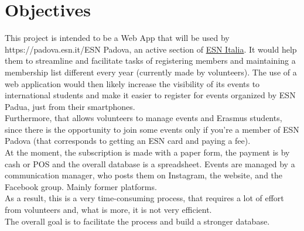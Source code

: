 \section{Objectives}

This project is intended to be a Web App that will be used by
{https://padova.esn.it/}ESN Padova, an active section of \href{https://padova.esn.it/}{ESN Italia}.
It would help them to streamline and facilitate tasks of
registering members and maintaining a membership list different every year (currently made by volunteers).
The use of a web application would then likely increase the visibility of its events to international students
and make it easier to register for events organized by ESN Padua, just from their smartphones.\\
Furthermore, that allows volunteers to
manage events and Erasmus students, since there is the opportunity to join some events
only if you’re a member of ESN Padova (that corresponds to getting an ESN card and paying a fee).\\
At the moment, the subscription is made with a paper form, the payment is by cash or POS and the overall database is a spreadsheet.
Events are managed by a communication manager, who posts them on Instagram, the website, and the Facebook group. Mainly former platforms.\\
As a result, this is a very time-consuming process, that requires a lot of effort from volunteers
and, what is more, it is not very efficient.\\
The overall goal is to facilitate the process and build a stronger database.